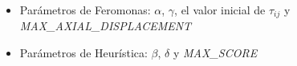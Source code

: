 
\begin{itemize}
    \item Par\'ametros de Feromonas: $\alpha$, $\gamma$, el valor inicial de $\tau_{ij}$ y {\it MAX\_AXIAL\_DISPLACEMENT}
    \item Par\'ametros de Heur\'istica: $\beta$, $\delta$ y {\it MAX\_SCORE}
\end{itemize}